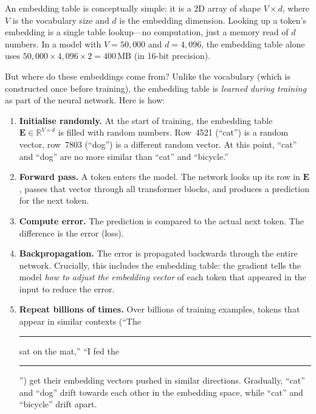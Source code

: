 \begin{engineernote}
An embedding table is conceptually simple: it is a 2D array of shape
$V \times d$, where $V$ is the vocabulary size and $d$ is the
embedding dimension. Looking up a token's embedding is a single
table lookup---no computation, just a memory read of $d$ numbers.
In a model with $V = 50{,}000$ and $d = 4{,}096$, the embedding
table alone uses $50{,}000 \times 4{,}096 \times 2 = 400$\,MB
(in 16-bit precision).
\end{engineernote}

But where do these embeddings come from? Unlike the vocabulary
(which is constructed once before training), the embedding table is
\emph{learned during training} as part of the neural network. Here
is how:

\begin{enumerate}[leftmargin=2em]
  \item \textbf{Initialise randomly.} At the start of training, the
    embedding table $\bm{E} \in \mathbb{R}^{V \times d}$ is filled
    with random numbers. Row~4521 (``cat'') is a random vector,
    row~7803 (``dog'') is a different random vector. At this point,
    ``cat'' and ``dog'' are no more similar than ``cat'' and
    ``bicycle.''

  \item \textbf{Forward pass.} A token enters the model. The
    network looks up its row in $\bm{E}$, passes that vector through
    all transformer blocks, and produces a prediction for the next
    token.

  \item \textbf{Compute error.} The prediction is compared to the
    actual next token. The difference is the error (loss).

  \item \textbf{Backpropagation.} The error is propagated backwards
    through the entire network. Crucially, this includes the
    embedding table: the gradient tells the model \emph{how to adjust
    the embedding vector} of each token that appeared in the input to
    reduce the error.

  \item \textbf{Repeat billions of times.} Over billions of training
    examples, tokens that appear in similar contexts (``The \rule{1cm}{0.15mm}
    sat on the mat,'' ``I fed the \rule{1cm}{0.15mm}'') get their
    embedding vectors pushed in similar directions. Gradually, ``cat''
    and ``dog'' drift towards each other in the embedding space, while
    ``cat'' and ``bicycle'' drift apart.
\end{enumerate}

